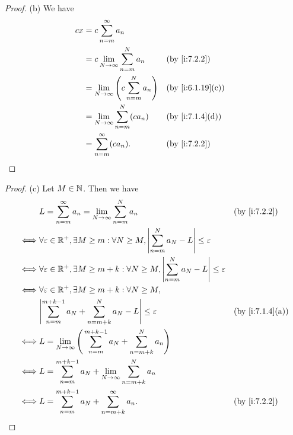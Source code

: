 \begin{proof}{(b)}
  We have
  \begin{align*}
    cx & = c \sum_{n = m}^\infty a_n                                                  \\
       & = c \lim_{N \to \infty} \sum_{n = m}^N a_n             &  & \by{i:7.2.2}     \\
       & = \lim_{N \to \infty} \Bigg(c \sum_{n = m}^N a_n\Bigg) &  & \by{i:6.1.19}[c] \\
       & = \lim_{N \to \infty} \sum_{n = m}^N (c a_n)           &  & \by{i:7.1.4}[d]  \\
       & = \sum_{n = m}^\infty (c a_n).                         &  & \by{i:7.2.2}
  \end{align*}
\end{proof}

\begin{proof}{(c)}
  Let \(M \in \mathbb{N}\).
  Then we have
  \begin{align*}
         & L = \sum_{n = m}^\infty a_n = \lim_{N \to \infty} \sum_{n = m}^N a_n                                                 &  & \by{i:7.2.2}    \\
    \iff & \forall \varepsilon \in \R^+, \exists M \geq m : \forall N \geq M, \abs{\sum_{n = m}^N a_N - L} \leq \varepsilon                          \\
    \iff & \forall \varepsilon \in \R^+, \exists M \geq m + k : \forall N \geq M, \abs{\sum_{n = m}^N a_N - L} \leq \varepsilon                      \\
    \iff & \forall \varepsilon \in \R^+, \exists M \geq m + k : \forall N \geq M,                                                                    \\
         & \abs{\sum_{n = m}^{m + k - 1} a_N + \sum_{n = m + k}^N a_N - L} \leq \varepsilon                                     &  & \by{i:7.1.4}[a] \\
    \iff & L = \lim_{N \to \infty} \Bigg(\sum_{n = m}^{m + k - 1} a_N + \sum_{n = m + k}^N a_n\Bigg)                                                 \\
    \iff & L = \sum_{n = m}^{m + k - 1} a_N + \lim_{N \to \infty} \sum_{n = m + k}^N a_n                                                             \\
    \iff & L = \sum_{n = m}^{m + k - 1} a_N + \sum_{n = m + k}^\infty a_n.                                                      &  & \by{i:7.2.2}
  \end{align*}
\end{proof}

